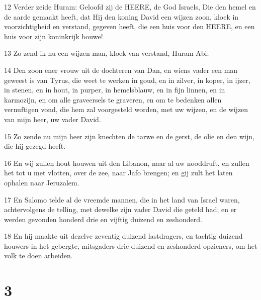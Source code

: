 \par 12 Verder zeide Huram: Geloofd zij de HEERE, de God Israels, Die den hemel en de aarde gemaakt heeft, dat Hij den koning David een wijzen zoon, kloek in voorzichtigheid en verstand, gegeven heeft, die een huis voor den HEERE, en een huis voor zijn koninkrijk bouwe!
\par 13 Zo zend ik nu een wijzen man, kloek van verstand, Huram Abi;
\par 14 Den zoon ener vrouw uit de dochteren van Dan, en wiens vader een man geweest is van Tyrus, die weet te werken in goud, en in zilver, in koper, in ijzer, in stenen, en in hout, in purper, in hemelsblauw, en in fijn linnen, en in karmozijn, en om alle graveersels te graveren, en om te bedenken allen vernuftigen vond, die hem zal voorgesteld worden, met uw wijzen, en de wijzen van mijn heer, uw vader David.
\par 15 Zo zende nu mijn heer zijn knechten de tarwe en de gerst, de olie en den wijn, die hij gezegd heeft.
\par 16 En wij zullen hout houwen uit den Libanon, naar al uw nooddruft, en zullen het tot u met vlotten, over de zee, naar Jafo brengen; en gij zult het laten ophalen naar Jeruzalem.
\par 17 En Salomo telde al de vreemde mannen, die in het land van Israel waren, achtervolgens de telling, met dewelke zijn vader David die geteld had; en er werden gevonden honderd drie en vijftig duizend en zeshonderd.
\par 18 En hij maakte uit dezelve zeventig duizend lastdragers, en tachtig duizend houwers in het gebergte, mitsgaders drie duizend en zeshonderd opzieners, om het volk te doen arbeiden.

\chapter{3}

